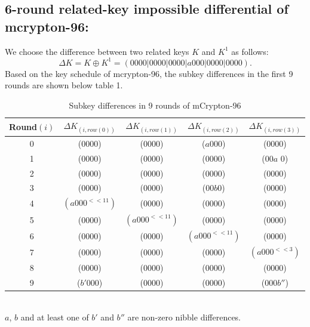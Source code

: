 \documentclass{transcrypto}
\begin{document}
	\subsection{6-round related-key impossible differential of mcrypton-96:}
	We choose the difference between two related keys $K$ and $K^1$ as follows:\\
	$$\Delta K = K \oplus K^1 = (0000|0000|0000|a000|0000|0000).$$
	Based on the key schedule of mcrypton-96, the subkey differences in the first 9 rounds are shown below table 1.
	\begin{table}[H]
		\centering
		\begin{tabular}{c c c c c}
			\hline
			Round$(i)$ & $\Delta K_(i,row(0))$ & $\Delta K_(i,row(1))$ & $\Delta K_(i,row(2))$ & $\Delta K_(i,row(3))$\\
			\hline
			0 & (0000) & (0000) & ($a$000) & (0000)\\
			1 & (0000) & (0000) & (0000) & (00$a$	0)\\
			2 & (0000) & (0000) & (0000) & (0000)\\
			3 & (0000) & (0000) & (00$b$0) & (0000)\\
			4 & $(a000^{<<11})$ & (0000) & (0000) & (0000)\\
			5 & (0000) & $(a000^{<<11})$ & (0000) & (0000)\\
			6 & (0000) & (0000) & $(a000^{<<11})$ & (0000)\\
			7 & (0000) & (0000) & (0000) & $(a000^{<<3})$\\
			8 & (0000) & (0000) & (0000) & (0000)\\
			9 & ($b'$000) & (0000) & (0000) & (000$b''$)\\
			\hline
			 
		\end{tabular}\\
	$a$, $b$ and at least one of $b'$ and $b''$ are non-zero nibble differences.
	\caption{Subkey differences in 9 rounds of mCrypton-96}
	\end{table}
\end{document}

